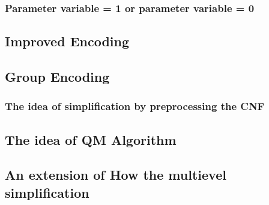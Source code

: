 \documentclass{article}
\begin{document}
\subsubsection{Parameter variable = 1 or parameter variable = 0}

\subsection{Improved Encoding}

\subsection{Group Encoding}
\subsubsection{The idea of simplification by preprocessing the CNF}
\subsection{The idea of QM Algorithm}
\subsection{An extension of How the multievel simplification }
\end{document}
